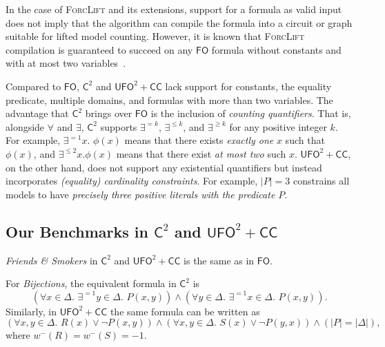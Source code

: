 \documentclass[a4paper,UKenglish,cleveref, autoref, thm-restate]{lipics-v2021}
\newcommand{\Ctwo}{$\mathsf{C}^{2}$}
\newcommand{\FO}{$\mathsf{FO}$}
\newcommand{\UFO}{$\mathsf{UFO}^{2} + \mathsf{CC}$}
\newcommand{\friends}{\emph{Friends \& Smokers}}
\newcommand{\bijections}{\emph{Bijections}}
\begin{document}
\begin{remark*}
  In the case of \textsc{ForcLift} and its extensions, support for a formula as
  valid input does not imply that the algorithm can compile the formula into a
  circuit or graph suitable for lifted model counting. However, it is known that
  \textsc{ForcLift} compilation is guaranteed to succeed on any \FO{} formula
  without constants and with at most two
  variables~\cite{DBLP:conf/nips/Broeck11,DBLP:conf/kr/BroeckMD14}.
\end{remark*}

Compared to \FO{}, \Ctwo{} and \UFO{} lack support for constants, the equality
predicate, multiple domains, and formulas with more than two variables. The
advantage that \Ctwo{} brings over \FO{} is the inclusion of \emph{counting
  quantifiers}. That is, alongside $\forall$ and $\exists$, \Ctwo{} supports
$\exists^{=k}$, $\exists^{\le k}$, and $\exists^{\ge k}$ for any positive
integer $k$. For example, $\exists^{=1} x\text{. }\phi(x)$ means that there
exists \emph{exactly one} $x$ such that $\phi(x)$, and $\exists^{\le 2} x\text{.
}\phi(x)$ means that there exist \emph{at most two} such $x$. \UFO{}, on the
other hand, does not support any existential quantifiers but instead
incorporates \emph{(equality) cardinality constraints}. For example, $|P| = 3$
constrains all models to have \emph{precisely three positive literals with the
  predicate $P$}.

\subsection{Our Benchmarks in \Ctwo{} and \UFO{}}


\friends{} in \Ctwo{} and \UFO{} is the same as in \FO{}.

For \bijections{}, the equivalent formula in \Ctwo{} is
\[
  (\forall x \in \Delta\text{. }\exists^{=1} y \in \Delta\text{.
  }P(x, y)) \land (\forall y \in \Delta\text{. }\exists^{=1} x \in \Delta\text{.
  }P(x, y)).
\]
Similarly, in \UFO{} the same formula can be written as
\[
  (\forall x, y \in \Delta\text{.
  }R(x) \lor \neg P(x, y)) \land (\forall x, y \in \Delta\text{.
  }S(x) \lor \neg P(y, x)) \land (|P| = |\Delta|),
\]
where $w^{-}(R) = w^{-}(S) = -1$.
\end{document}
